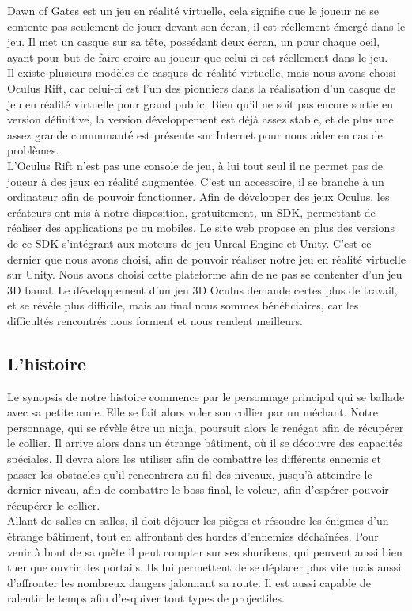 \documentclass[12pt]{article}
\begin{document}
Dawn of Gates est un jeu en réalité virtuelle, cela signifie que le joueur ne se contente pas seulement de jouer devant son écran, il est réellement émergé dans le jeu. Il met un casque sur sa tête, possédant deux écran, un pour chaque oeil, ayant pour but de faire croire au joueur que celui-ci est réellement dans le jeu.\\
Il existe plusieurs modèles de casques de réalité virtuelle, mais nous avons choisi Oculus Rift, car celui-ci est l'un des pionniers dans la réalisation d'un casque de jeu en réalité virtuelle pour grand public. Bien qu'il ne soit pas encore sortie en version définitive, la version développement est déjà assez stable, et de plus une assez grande communauté est présente sur Internet pour nous aider en cas de problèmes.\\
L'Oculus Rift n'est pas une console de jeu, à lui tout seul il ne permet pas de joueur à des jeux en réalité augmentée. C'est un accessoire, il se branche à un ordinateur afin de pouvoir fonctionner. Afin de développer des jeux Oculus, les créateurs ont mis à notre disposition, gratuitement, un \gls{SDK}, permettant de réaliser des applications pc ou mobiles. Le site web propose en plus des versions de ce SDK s'intégrant aux moteurs de jeu Unreal Engine \cite{unreal} et Unity. C'est ce dernier que nous avons choisi, afin de pouvoir réaliser notre jeu en réalité virtuelle sur Unity.
Nous avons choisi cette plateforme afin de ne pas se contenter d'un jeu 3D banal. Le développement d'un jeu 3D Oculus demande certes plus de travail, et se révèle plus difficile, mais au final nous sommes bénéficiaires, car les difficultés rencontrés nous forment et nous rendent meilleurs.

\newpage

\subsection{L'histoire}

Le synopsis de notre histoire commence par le personnage principal qui se ballade avec sa petite amie. Elle se fait alors voler son collier par un méchant. Notre personnage, qui se révèle être un ninja, poursuit alors le renégat afin de récupérer le collier. Il arrive alors dans un étrange bâtiment, où il se découvre des capacités spéciales. Il devra alors les utiliser afin de combattre les différents ennemis et passer les obstacles qu'il rencontrera au fil des niveaux, jusqu'à atteindre le dernier niveau, afin de combattre le boss final, le voleur, afin d'espérer pouvoir récupérer le collier.\\
Allant de salles en salles, il doit déjouer les pièges et résoudre les énigmes d'un étrange bâtiment, tout en affrontant des hordes d'ennemies déchaînées. Pour venir à bout de sa quête il peut compter sur ses shurikens, qui peuvent aussi bien tuer que ouvrir des portails. Ils lui permettent de se déplacer plus vite mais aussi d'affronter les nombreux dangers jalonnant sa route. Il est aussi capable de ralentir le temps afin d'esquiver tout types de projectiles.
\end{document}

